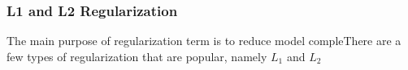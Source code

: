 \subsubsection{L1 and L2 Regularization}

The main purpose of regularization term is to reduce model compleThere are a few types of regularization that are popular, namely $L_1$ and $L_2$